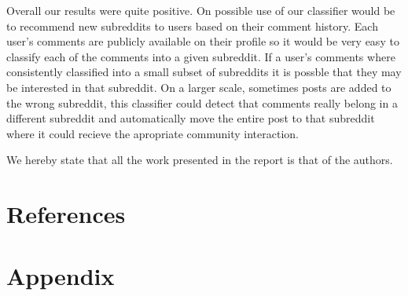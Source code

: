 \documentclass[10pt,twocolumn]{article}
\begin{document}
Overall our results were quite positive. On possible use of our classifier would be to recommend new subreddits to users based on their comment history. Each user's comments are publicly available on their profile so it would be very easy to classify each of the comments into a given subreddit. If a user's comments where consistently classified into a small subset of subreddits it is possble that they may be interested in that subreddit. On a larger scale, sometimes posts are added to the wrong subreddit, this classifier could detect that comments really belong in a different subreddit and automatically move the entire post to that subreddit where it could recieve the apropriate community interaction.

We hereby state that all the work presented in the report is that of the authors.

\section{References}
\printbibliography
\section{Appendix}
\end{document}
